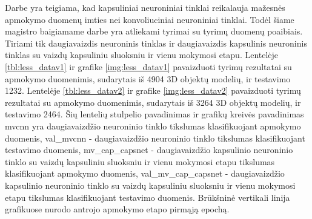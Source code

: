Darbe \cite{capsNet} yra teigiama, kad kapsuliniai neuroniniai tinklai reikalauja mažesnės apmokymo duomenų imties nei konvoliuciniai neuroniniai tinklai. Todėl šiame magistro baigiamame darbe yra atliekami tyrimai su tyrimų duomenų poaibiais. Tiriami tik daugiavaizdis neuroninis tinklas ir daugiavaizdis kapsulinis neuroninis tinklas su vaizdų kapsuliniu sluoksniu ir vienu mokymosi etapu. Lentelėje \ref{tbl:less_datav1} ir grafike \ref{img:less_datav1} pavaizduoti tyrimų rezultatai su apmokymo duomenimis, sudarytais iš 4904 3D objektų modelių, ir testavimo 1232. Lentelėje \ref{tbl:less_datav2} ir grafike \ref{img:less_datav2} pavaizduoti tyrimų rezultatai su apmokymo duomenimis, sudarytais iš 3264 3D objektų modelių, ir testavimo 2464. Šių lentelių stulpelio pavadinimas ir grafikų kreivės pavadinimas mvcnn yra daugiavaizdžio neuroninio tinklo tikslumas klasifikuojant apmokymo duomenis, val\_mvcnn - daugiavaizdžio neuroninio tinklo tikslumas klasifikuojant testavimo duomenis, mv\_cap\_capsnet - daugiavaizdžio kapsulinio neuroninio tinklo su vaizdų kapsuliniu sluoksniu ir vienu mokymosi etapu tikslumas klasifikuojant apmokymo duomenis, val\_mv\_cap\_capsnet - daugiavaizdžio kapsulinio neuroninio tinklo su vaizdų kapsuliniu sluoksniu ir vienu mokymosi etapu tikslumas klasifikuojant testavimo duomenis. Brūkšninė vertikali linija grafikuose nurodo antrojo apmokymo etapo pirmąją epochą.

